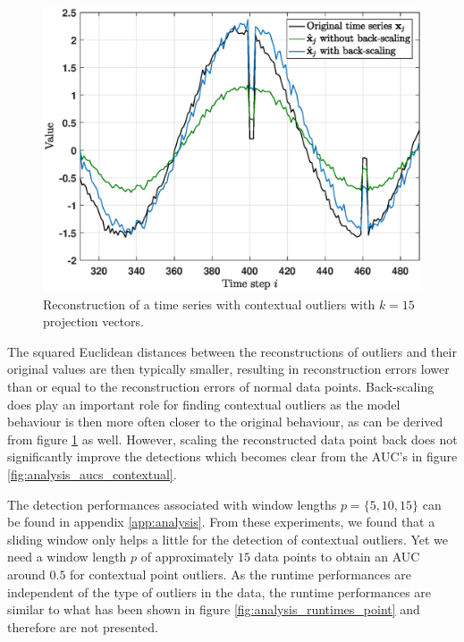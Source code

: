\begin{figure}[h]
	\centering
	\vspace{0.1cm}
	\includegraphics[scale=0.38]{analysis/Analysis_contextualreconstructionrp}
	\caption{Reconstruction of a time series with contextual outliers with $k=15$ projection vectors.}
	\label{fig:analysis_contextualreconstruction}
\end{figure}

\newpage
The squared Euclidean distances between the reconstructions of outliers and their original values are then typically smaller, resulting in reconstruction errors lower than or equal to the reconstruction errors of normal data points. Back-scaling does play an important role for finding contextual outliers as the model behaviour is then more often closer to the original behaviour, as can be derived from figure \ref{fig:analysis_contextualreconstruction} as well. However, scaling the reconstructed data point back does not significantly improve the detections which becomes clear from the AUC's in figure \ref{fig:analysis_aucs_contextual}. 

The detection performances associated with window lengths $p=\{5,10,15\}$ can be found in appendix \ref{app:analysis}. From these experiments, we found that a sliding window only helps a little for the detection of contextual outliers. Yet we need a window length $p$ of approximately $15$ data points to obtain an AUC around $0.5$ for contextual point outliers. As the runtime performances are independent of the type of outliers in the data, the runtime performances are similar to what has been shown in figure \ref{fig:analysis_runtimes_point} and therefore are not presented.

